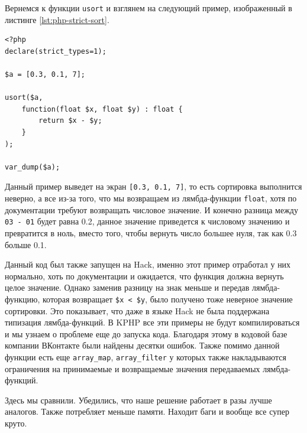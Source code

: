 Вернемся к функции \verb|usort| и взглянем на следующий пример, изображенный в листинге \ref{lst:php-strict-sort}.
\begin{lstlisting}[caption={Пример типизации в PHP7}, label={lst:php-strict-type}]
<?php
declare(strict_types=1);

$a = [0.3, 0.1, 7];

usort($a,
    function(float $x, float $y) : float {
        return $x - $y;
    }
);

var_dump($a);
\end{lstlisting}

Данный пример выведет на экран \verb|[0.3, 0.1, 7]|, то есть сортировка выполнится неверно, а все из-за того, что мы возвращаем из лямбда-функции \verb|float|, хотя по документации требуют возвращать числовое значение.
И конечно разница между \verb|03 - 01| будет равна 0.2, данное значение приведется к числовому значению и превратится в ноль, вместо того, чтобы вернуть число большее нуля, так как 0.3 больше 0.1.

Данный код был также запущен на Hack, именно этот пример отработал у них нормально, хоть по документации и ожидается, что функция должна вернуть целое значение.
Однако заменив разницу на знак меньше и передав лямбда-функцию, которая возвращает \verb|$x < $y|, было получено тоже неверное значение сортировки.
Это показывает, что даже в языке Hack не была поддержана типизация лямбда-функций.
В KPHP все эти примеры не будут компилироваться и мы узнаем о проблеме еще до запуска кода.
Благодаря этому в кодовой базе компании ВКонтакте были найдены десятки ошибок.
Также помимо данной функции есть еще \verb|array_map|, \verb|array_filter| у которых также накладываются ограничения на принимаемые и возвращаемые значения передаваемых лямбда-функций.

\chapterconclusion
Здесь мы сравнили.
Убедились, что наше решение работает в разы лучше аналогов.
Также потребляет меньше памяти.
Находит баги и вообще все супер круто.